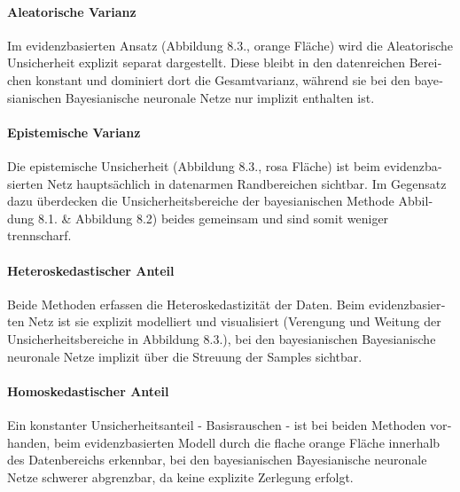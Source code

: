 \begin{otherlanguage}{ngerman}
\paragraph{Aleatorische Varianz} Im evidenzbasierten Ansatz (Abbildung 8.3., orange Fläche) wird die \gls{Aleatorische Unsicherheit} explizit separat dargestellt. Diese bleibt in den datenreichen Bereichen konstant und dominiert dort die Gesamtvarianz, während sie bei den \gls{bayesianischen Bayesianische neuronale Netze} nur implizit enthalten ist.

\paragraph{Epistemische Varianz} Die epistemische Unsicherheit (Abbildung 8.3., rosa Fläche) ist beim evidenzbasierten Netz hauptsächlich in datenarmen Randbereichen sichtbar. Im Gegensatz dazu überdecken die Unsicherheitsbereiche der bayesianischen Methode Abbildung 8.1. & Abbildung 8.2) beides gemeinsam und sind somit weniger trennscharf.

\paragraph{Heteroskedastischer Anteil} Beide Methoden erfassen die Heteroskedastizität der Daten. Beim evidenzbasierten Netz ist sie explizit modelliert und visualisiert (Verengung und Weitung der Unsicherheitsbereiche in Abbildung 8.3.), bei den \gls{bayesianischen Bayesianische neuronale Netze} implizit über die Streuung der Samples sichtbar.

\paragraph{Homoskedastischer Anteil} Ein konstanter Unsicherheitsanteil - Basisrauschen - ist bei beiden Methoden vorhanden, beim evidenzbasierten Modell durch die flache orange Fläche innerhalb des Datenbereichs erkennbar, bei den \gls{bayesianischen Bayesianische neuronale Netze} schwerer abgrenzbar, da keine explizite Zerlegung erfolgt.



\end{otherlanguage}
